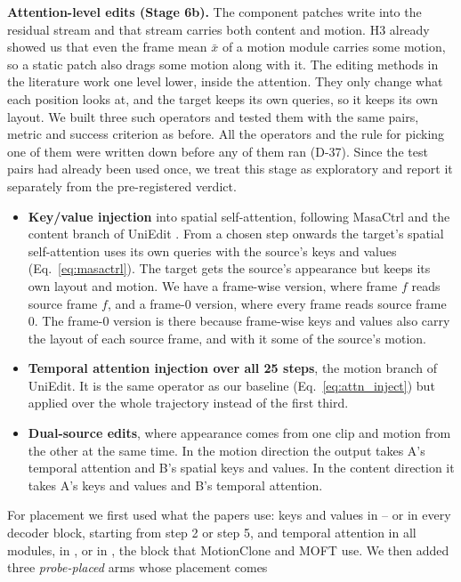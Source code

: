 \documentclass[twoside,english]{article}
\newcommand{\xs}{\bar{x}}         %
\begin{document}
\textbf{Attention-level edits (Stage 6b).} The component patches write into the residual stream
and that stream carries both content and motion. H3 already showed us that even the frame mean
$\xs$ of a motion module carries some motion, so a static patch also drags some motion along with
it. The editing methods in the literature work one level lower, inside the attention. They only
change what each position looks at, and the target keeps its own queries, so it keeps its own
layout. We built three such operators and tested them with the same pairs, metric and success
criterion as before. All the operators and the rule for picking one of them were written down
before any of them ran (D-37). Since the test pairs had already been used once, we treat this stage
as exploratory and report it separately from the pre-registered verdict.
\begin{itemize}
\item \textbf{Key/value injection} into spatial self-attention, following MasaCtrl
  \citep{cao2023masactrl} and the content branch of UniEdit \citep{bai2024uniedit}. From a chosen
  step onwards the target's spatial self-attention uses its own queries with the source's keys and
  values (Eq.~\eqref{eq:masactrl}). The target gets the source's appearance but keeps its own layout
  and motion. We have a frame-wise version, where frame $f$ reads source frame $f$, and a frame-0
  version, where every frame reads source frame 0. The frame-0 version is there because frame-wise
  keys and values also carry the layout of each source frame, and with it some of the source's motion.
\item \textbf{Temporal attention injection over all 25 steps}, the motion branch of UniEdit. It is
  the same operator as our baseline (Eq.~\eqref{eq:attn_inject}) but applied over the whole
  trajectory instead of the first third.
\item \textbf{Dual-source edits}, where appearance comes from one clip and motion from the other at
  the same time. In the motion direction the output takes A's temporal attention and B's spatial keys
  and values. In the content direction it takes A's keys and values and B's temporal attention.
\end{itemize}
For placement we first used what the papers use: keys and values in -- or
in every decoder block, starting from step 2 or step 5, and temporal attention in all modules, in
, or in , the block that MotionClone \citep{ling2025motionclone}
and MOFT \citep{xiao2024moft} use. We then added three \emph{probe-placed} arms whose placement comes
\end{document}
